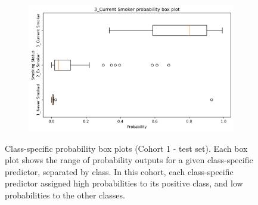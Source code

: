 \documentclass[draft]{article} %
\begin{document}
\begin{figure}[p]
\begin{subfigure}{0.75\linewidth}
    \end{subfigure}
    \begin{subfigure}{0.75\linewidth}
        \centering
        \includegraphics[width=\linewidth]{cohort1/test_boxplot_3.png}
    \end{subfigure}
    \caption[Class-specific probability box plots (Cohort 1)]{Class-specific probability box plots (Cohort 1 - test set). Each box plot shows the range of probability outputs for a given class-specific predictor, separated by class. In this cohort, each class-specific predictor assigned high probabilities to its positive class, and low probabilities to the other classes.}
    \label{fig:cohort1-boxplots}
\end{figure}


\end{document}
